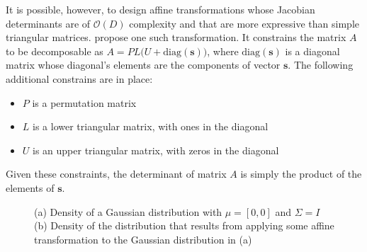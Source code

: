 It is possible, however, to design affine transformations whose Jacobian determinants
are of $\mathcal{O}(D)$ complexity and that are more expressive than simple
triangular matrices. \textcite{Glow} propose one such transformation. It
constrains the matrix $A$ to be decomposable as ${A = PL\big(U + \mbox{diag}(\bm{s})\big)}$,
where $\mbox{diag}(\bm{s})$ is a diagonal matrix whose diagonal's elements are
the components of vector $\bm{s}$. The following additional constrains are in place:
\begin{itemize}
    \item $P$ is a permutation matrix
    \item $L$ is a lower triangular matrix, with ones in the diagonal
    \item $U$ is an upper triangular matrix, with zeros in the diagonal
\end{itemize}
Given these constraints, the determinant of matrix $A$ is simply the product
of the elements of $\bm{s}$.

\begin{figure}[!htb]
  \begin{subfigmatrix}{2}
  \end{subfigmatrix}
    \caption{(a) Density of a Gaussian distribution with $\mu = [0, 0]$ and $\Sigma = I$
    (b) Density of the distribution that results from applying some affine transformation to
    the Gaussian distribution in (a)
    }
  \label{fig:affine}
\end{figure}

